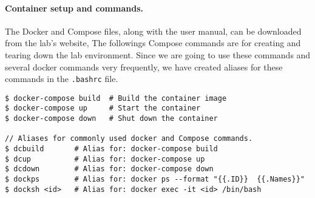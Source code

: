 
\paragraph{Container setup and commands.}
The Docker and Compose files, along with the user manual,
can be downloaded from the lab's website,
The followings Compose commands are for creating and tearing down
the lab environment. 
Since we are going to use 
these commands and several docker commands very
frequently, we have created aliases for these commands
in the \texttt{.bashrc} file.  


\begin{lstlisting}
$ docker-compose build  # Build the container image
$ docker-compose up     # Start the container
$ docker-compose down   # Shut down the container

// Aliases for commonly used docker and Compose commands. 
$ dcbuild       # Alias for: docker-compose build
$ dcup          # Alias for: docker-compose up
$ dcdown        # Alias for: docker-compose down
$ dockps        # Alias for: docker ps --format "{{.ID}}  {{.Names}}" 
$ docksh <id>   # Alias for: docker exec -it <id> /bin/bash
\end{lstlisting}
